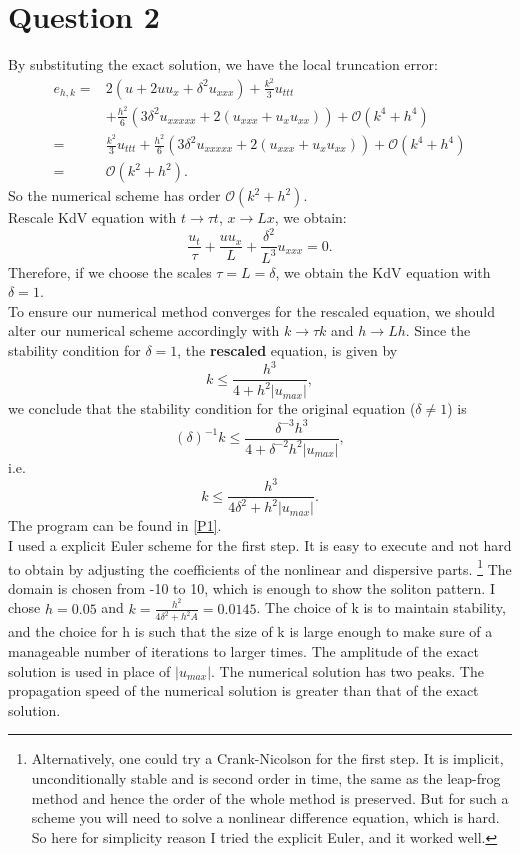 \documentclass[a4paper,11pt]{article}
\begin{document}
\section{Question 2}
By substituting the exact solution, we have the local truncation error:
\begin{align*}
e_{h,k} =& 2(u+2uu_x+\delta^2u_{xxx})+\frac{k^2}{3}u_{ttt}\\
&+\frac{h^2}{6}(3\delta^2u_{xxxxx}+2(u_{xxx}+u_{x}u_{xx}))+\mathcal{O}(k^4+h^4)\\
 =& \frac{k^2}{3}u_{ttt}+\frac{h^2}{6}(3\delta^2u_{xxxxx}+2(u_{xxx}+u_{x}u_{xx}))+\mathcal{O}(k^4+h^4) \\=& \mathcal{O}(k^2+h^2).
\end{align*}
So the numerical scheme has order $\mathcal{O}(k^2+h^2)$. \\
Rescale KdV equation with $t \rightarrow \tau t$, $x \rightarrow Lx$, we obtain:
$$\frac{u_t}{\tau} + \frac{uu_x}{L} + \frac{\delta^2}{L^3}u_{xxx} = 0.$$ Therefore, if we choose the scales $\tau = L = \delta$, we obtain the KdV equation with $\delta = 1$.\\
To ensure our numerical method converges for the rescaled equation,  we should alter our numerical scheme accordingly with $k \rightarrow \tau k$ and $h \rightarrow Lh$.
Since the stability condition for $\delta =  1$, the \textbf{rescaled} equation, is given by $$k \leqslant \frac{h^3}{4+h^2|u_{max}|},$$ we conclude that the stability condition for the original equation ($\delta \neq 1$) is $$(\delta)^{-1} k \leqslant \frac{{\delta}^{-3} h^3}{4+{\delta}^{-2} h^2|u_{max}|},$$ i.e. $$k \leqslant \frac{h^3}{4\delta^2+h^2|u_{max}|}.$$
The program can be found in \ref{P1}.\\
I used a explicit Euler scheme for the first step. It is easy to execute and not hard to obtain by adjusting the coefficients of the nonlinear and dispersive parts. \footnote{Alternatively, one could try a Crank-Nicolson for the first step. It is implicit, unconditionally stable and is second order in time, the same as the leap-frog method and hence the order of the whole method is preserved. But for such a scheme you will need to solve a nonlinear difference equation, which is hard. So here for simplicity reason I tried the explicit Euler, and it worked well.} The domain is chosen from -10 to 10, which is enough to show the soliton pattern. I chose $h = 0.05$ and $k = \frac{h^2}{4\delta^2+h^2A} = 0.0145$. The choice of k is to maintain stability, and the choice for h is such that the size of k is large enough to make sure of a manageable number of iterations to larger times. The amplitude of the exact solution is used in place of $|u_{max}|$. The numerical solution has two peaks. The propagation speed of the numerical solution is greater than that of the exact solution.
\end{document}
